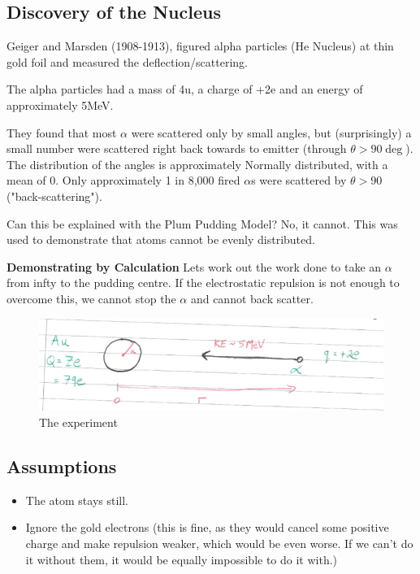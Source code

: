 \subsection*{Discovery of the Nucleus}
Geiger and Marsden (1908-1913), figured alpha particles (He Nucleus) at thin gold foil and measured the deflection/scattering.

The alpha particles had a mass of 4u, a charge of +2e and an energy of approximately 5MeV.

They found that most $\alpha$ were scattered only by small angles, but (surprisingly) a small number were scattered right back towards to emitter (through $\theta > 90\deg$). The distribution of the angles is approximately Normally distributed, with a mean of 0. Only approximately 1 in 8,000 fired $\alpha$s were scattered by $\theta>90$ ("back-scattering").

Can this be explained with the Plum Pudding Model? No, it cannot. This was used to demonstrate that atoms cannot be evenly distributed.

\textbf{Demonstrating by Calculation}
Lets work out the work done to take an $\alpha$ from infty to the pudding centre. If the electrostatic repulsion is not enough to overcome this, we cannot stop the $\alpha$ and cannot back scatter.

\begin{figure}[H]
    \centering
    \includegraphics{figures/scattering.png}
     \caption{The experiment}
\end{figure}

\subsection*{Assumptions}
\begin{itemize}
    \item The atom stays still.
    \item Ignore the gold electrons (this is fine, as they would cancel some positive charge and make repulsion weaker, which would be even worse. If we can't do it without them, it would be equally impossible to do it with.)
\end{itemize}

